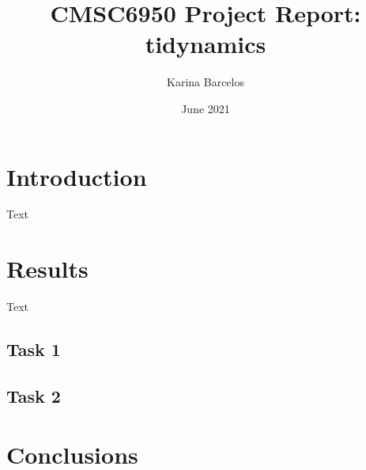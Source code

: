 \documentclass{article}
\title{CMSC6950 Project Report: tidynamics}
\author{Karina Barcelos}
\date{June 2021}
\begin{document}
\maketitle

\section{Introduction}

Text 

\section{Results}

Text
\subsection{Task 1}

\subsection{Task 2}

\section{Conclusions}


\end{document}
